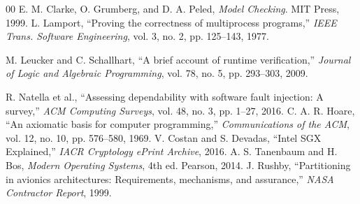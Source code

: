 \documentclass[conference]{IEEEtran}
\begin{document}
\begin{thebibliography}{00}
 E. M. Clarke, O. Grumberg, and D. A. Peled, \textit{Model Checking}. MIT Press, 1999.
 L. Lamport, ``Proving the correctness of multiprocess programs,'' \textit{IEEE Trans. Software Engineering}, vol. 3, no. 2, pp. 125--143, 1977.

 M. Leucker and C. Schallhart, ``A brief account of runtime verification,'' \textit{Journal of Logic and Algebraic Programming}, vol. 78, no. 5, pp. 293--303, 2009.

 R. Natella et al., ``Assessing dependability with software fault injection: A survey,'' \textit{ACM Computing Surveys}, vol. 48, no. 3, pp. 1--27, 2016.
 C. A. R. Hoare, ``An axiomatic basis for computer programming,'' \textit{Communications of the ACM}, vol. 12, no. 10, pp. 576--580, 1969.
 V. Costan and S. Devadas, ``Intel SGX Explained,'' \textit{IACR Cryptology ePrint Archive}, 2016.
 A. S. Tanenbaum and H. Bos, \textit{Modern Operating Systems}, 4th ed. Pearson, 2014.
 J. Rushby, ``Partitioning in avionics architectures: Requirements, mechanisms, and assurance,'' \textit{NASA Contractor Report}, 1999.

\end{thebibliography}
\end{document}
